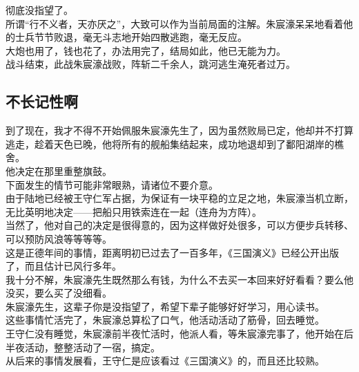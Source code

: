 \begin{multicols}{\theparacolNo}
彻底没指望了。\\

所谓“行不义者，天亦厌之”，大致可以作为当前局面的注解。朱宸濠呆呆地看着他的士兵节节败退，毫无斗志地开始四散逃跑，毫无反应。\\

大炮也用了，钱也花了，办法用完了，结局如此，他已无能为力。\\

战斗结束，此战朱宸濠战败，阵斩二千余人，跳河逃生淹死者过万。\\

\subsection{不长记性啊}
到了现在，我才不得不开始佩服朱宸濠先生了，因为虽然败局已定，他却并不打算逃走，趁着天色已晚，他将所有的舰船集结起来，成功地退却到了鄱阳湖岸的樵舍。\\

他决定在那里重整旗鼓。\\

下面发生的情节可能非常眼熟，请诸位不要介意。\\

由于陆地已经被王守仁军占据，为保证有一块平稳的立足之地，朱宸濠当机立断，无比英明地决定——把船只用铁索连在一起（连舟为方阵）。\\

当然了，他对自己的决定是很得意的，因为这样做好处很多，可以方便步兵转移、可以预防风浪等等等等。\\

这是正德年间的事情，距离明初已过去了一百多年，《三国演义》已经公开出版了，而且估计已风行多年。\\

我十分不解，朱宸濠先生既然那么有钱，为什么不去买一本回来好好看看？要么他没买，要么买了没细看。\\

朱宸濠先生，这辈子你是没指望了，希望下辈子能够好好学习，用心读书。\\

这些事情忙活完了，朱宸濠总算松了口气，他活动活动了筋骨，回去睡觉。\\

王守仁没有睡觉，朱宸濠前半夜忙活时，他派人看，等朱宸濠完事了，他开始在后半夜活动，整整活动了一宿，搞定。\\

从后来的事情发展看，王守仁是应该看过《三国演义》的，而且还比较熟。\\


\end{multicols}

